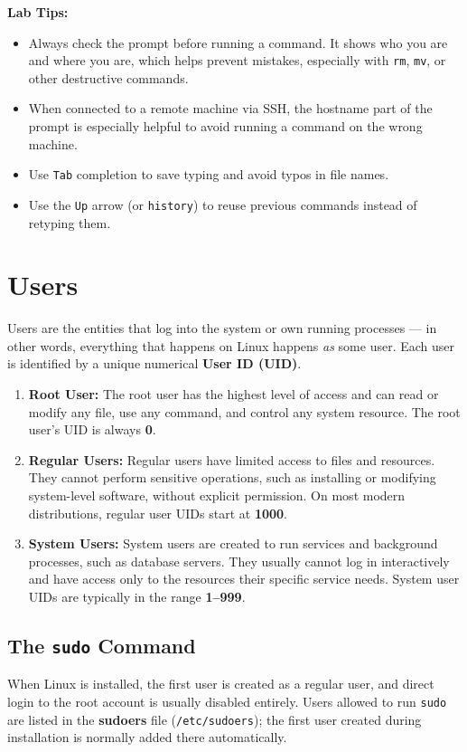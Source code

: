\textbf{Lab Tips:}
\begin{itemize}
    \item Always check the prompt before running a command. It shows who you are and where you are, which helps prevent mistakes, especially with \texttt{rm}, \texttt{mv}, or other destructive commands.
    \item When connected to a remote machine via SSH, the hostname part of the prompt is especially helpful to avoid running a command on the wrong machine.
    \item Use \texttt{Tab} completion to save typing and avoid typos in file names.
    \item Use the \texttt{Up} arrow (or \texttt{history}) to reuse previous commands instead of retyping them.
\end{itemize}

\section{Users}
Users are the entities that log into the system or own running processes — in other words, everything that happens on Linux happens \emph{as} some user. Each user is identified by a unique numerical \textbf{User ID (UID)}.

\begin{enumerate}
    \item \textbf{Root User:} The root user has the highest level of access and can read or modify any file, use any command, and control any system resource. The root user's UID is always \textbf{0}.
    \item \textbf{Regular Users:} Regular users have limited access to files and resources. They cannot perform sensitive operations, such as installing or modifying system-level software, without explicit permission. On most modern distributions, regular user UIDs start at \textbf{1000}.
    \item \textbf{System Users:} System users are created to run services and background processes, such as database servers. They usually cannot log in interactively and have access only to the resources their specific service needs. System user UIDs are typically in the range \textbf{1--999}.
\end{enumerate}

\subsection{The \texttt{sudo} Command}
When Linux is installed, the first user is created as a regular user, and direct login to the root account is usually disabled entirely. Users allowed to run \texttt{sudo} are listed in the \textbf{sudoers} file (\texttt{/etc/sudoers}); the first user created during installation is normally added there automatically.

